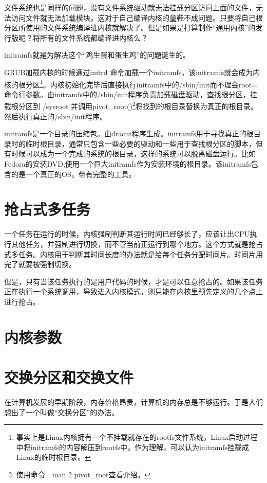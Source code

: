 文件系统也是同样的问题，没有文件系统驱动就无法挂载分区访问上面的文件，无法访问文件就无法加载模块。这对于自己编译内核的童鞋不成问题。只要将自己根分区所使用的文件系统编译进内核就解决了。但是如果是打算制作“通用内核”的发行版呢？将所有的文件系统都编译进内核么？

initramfs就是为解决这个“鸡生蛋和蛋生鸡”的问题诞生的。

GRUB加载内核的时候通过initrd 命令加载一个initramfs，该initramfs就会成为内核的根分区\footnote{事实上是Linux内核拥有一个不挂载就存在的rootfs文件系统，Linux启动过程中将initramfs的内容解压到rootfs中。作为理解，可以认为initramfs挂载成Linux的临时根目录。}。内核初始化完毕后直接执行initramfs中的/sbin/init而不理会root=命令行参数。由initramfs中的/sbin/init程序负责加载磁盘驱动，查找根分区，挂载根分区到 /sysroot 并调用pivot\_root()\footnote{使用命令　man 2 pivot\_root查看介绍。}将找到的根目录替换为真正的根目录。然后执行真正的/sbin/init程序。

initramfs是一个目录的压缩包。由dracut程序生成。initramfs用于寻找真正的根目录时的临时根目录，通常只包含一些必要的驱动和一些用于查找根分区的脚本，但有时候可以成为一个完成的系统的根目录，这样的系统可以脱离磁盘运行。比如Fedora的安装DVD,使用一个巨大initramfs作为安装环境的根目录。该initramfs包含的是一个真正的OS，带有完整的工具。

\section{抢占式多任务}\label{FAQ:preemptmultitasking}

一个任务在运行的时候，内核强制判断其运行时间已经够长了，应该让出CPU执行其他任务，并强制进行切换，而不管当前正运行到哪个地方。这个方式就是抢占式多任务。内核用于判断其时间长度的办法就是给每个任务分配时间片。时间片用完了就要被强制切换。

但是，只有当该任务执行的是用户代码的时候，才是可以任意抢占的。如果该任务正在执行一个系统调用，导致进入内核模式，则只能在内核里预先定义的几个点上进行抢占。

\section{内核参数}\label{FAQ：kernelparamter}


\section{交换分区和交换文件}\label{FAQ:swap}

在计算机发展的早期阶段，内存价格昂贵，计算机的内存总是不够运行。于是人们想出了一个叫做“交换分区”的办法。

